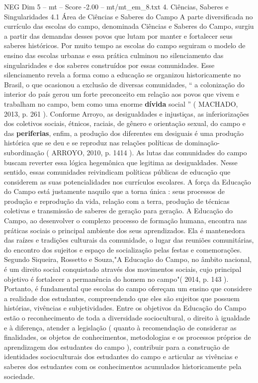 \begin{textsample}{NEG Dim 5 – mt – Score -2.00 – mt/mt\_em\_8.txt}  \label{ex:f5_neg_201}
4.
Ciências, Saberes e Singularidades 4.1 Área de Ciências e Saberes do Campo A parte diversificada no currículo das escolas do campo, denominada Ciências e Saberes do Campo, surgiu a partir das demandas desses povos que lutam por manter e fortalecer seus saberes históricos.
Por muito tempo as escolas do campo seguiram o modelo de ensino das escolas urbanas e essa prática culminou no silenciamento das singularidades e dos saberes construídos por essas comunidades.
Esse silenciamento revela a forma como a educação se organizou historicamente no Brasil, o que ocasionou a exclusão de diversas comunidades, “ a colonização do interior do país gerou um forte preconceito em relação aos povos que vivem e trabalham no campo, bem como uma enorme \textbf{dívida} social ” ( MACHADO, 2013, p. 261 ).
Conforme Arroyo, as desigualdades e injustiças, as inferiorizações dos coletivos sociais, étnicos, raciais, de gênero e orientação sexual, do campo e das \textbf{periferias}, enfim, a produção dos diferentes em desiguais é uma produção histórica que se deu e se reproduz nas relações políticas de dominação-subordinação ( ARROYO, 2010, p. 1414 ).
As lutas das comunidades do campo buscam reverter essa lógica hegemônica que legitima as desigualdades.
Nesse sentido, essas comunidades reivindicam políticas públicas de educação que considerem as suas potencialidades nos currículos escolares.
A força da Educação do Campo está justamente naquilo que a torna única : seus processos de produção e reprodução da vida, relação com a terra, produção de técnicas coletivas e transmissão de saberes de geração para geração.
A Educação do Campo, ao desenvolver o complexo processo de formação humana, encontra nas práticas sociais o principal ambiente dos seus aprendizados.
Ela é mantenedora das raízes e tradições culturais da comunidade, o lugar das reuniões comunitárias, do encontro dos sujeitos e espaço de socialização pelas festas e comemorações.
Segundo Siqueira, Rossetto e Souza,"A Educação do Campo, no âmbito nacional, é um direito social conquistado através dos movimentos sociais, cujo principal objetivo é fortalecer a permanência do homem no campo"( 2014, p. 143 ).
Portanto, é fundamental que escolas do campo ofereçam um ensino que considere a realidade dos estudantes, compreendendo que eles são sujeitos que possuem histórias, vivências e subjetividades.
Entre os objetivos da Educação do Campo estão o reconhecimento de toda a diversidade sociocultural, o direito à igualdade e à diferença, atender a legislação ( quanto à recomendação de considerar as finalidades, os objetos de conhecimentos, metodologias e os processos próprios de aprendizagem dos estudantes do campo ), contribuir para a construção de identidades socioculturais dos estudantes do campo e articular as vivências e saberes dos estudantes com os conhecimentos acumulados historicamente pela sociedade.

\end{textsample}
